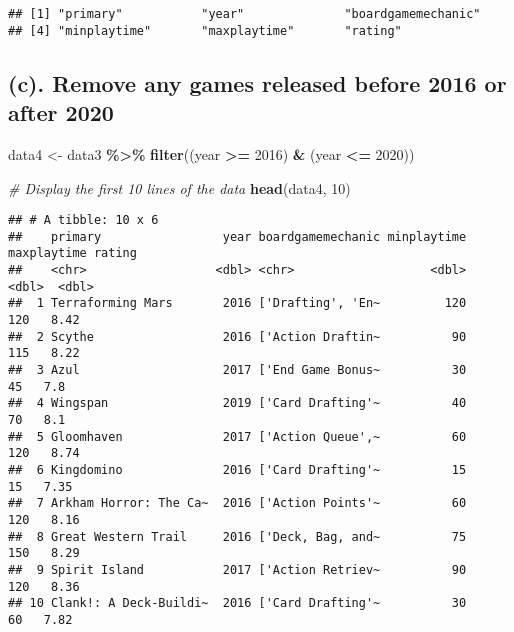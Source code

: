 \documentclass[
]{article}
\newenvironment{Shaded}{\begin{snugshade}}{\end{snugshade}}
\newcommand{\CommentTok}[1]{\textcolor[rgb]{0.56,0.35,0.01}{\textit{#1}}}
\newcommand{\DecValTok}[1]{\textcolor[rgb]{0.00,0.00,0.81}{#1}}
\newcommand{\FunctionTok}[1]{\textcolor[rgb]{0.13,0.29,0.53}{\textbf{#1}}}
\newcommand{\NormalTok}[1]{#1}
\newcommand{\OtherTok}[1]{\textcolor[rgb]{0.56,0.35,0.01}{#1}}
\newcommand{\SpecialCharTok}[1]{\textcolor[rgb]{0.81,0.36,0.00}{\textbf{#1}}}
\begin{document}
\begin{verbatim}
## [1] "primary"           "year"              "boardgamemechanic"
## [4] "minplaytime"       "maxplaytime"       "rating"
\end{verbatim}

\hypertarget{c.-remove-any-games-released-before-2016-or-after-2020}{%
\subsection{(c). Remove any games released before 2016 or after 2020}\label{c.-remove-any-games-released-before-2016-or-after-2020}}

\begin{Shaded}
\begin{Highlighting}[]
\NormalTok{data4 }\OtherTok{\textless{}{-}}\NormalTok{ data3 }\SpecialCharTok{\%\textgreater{}\%}
  \FunctionTok{filter}\NormalTok{((year }\SpecialCharTok{\textgreater{}=} \DecValTok{2016}\NormalTok{) }\SpecialCharTok{\&}\NormalTok{ (year }\SpecialCharTok{\textless{}=} \DecValTok{2020}\NormalTok{))}

\CommentTok{\# Display the first 10 lines of the data}
\FunctionTok{head}\NormalTok{(data4, }\DecValTok{10}\NormalTok{)}
\end{Highlighting}
\end{Shaded}

\begin{verbatim}
## # A tibble: 10 x 6
##    primary                 year boardgamemechanic minplaytime maxplaytime rating
##    <chr>                  <dbl> <chr>                   <dbl>       <dbl>  <dbl>
##  1 Terraforming Mars       2016 ['Drafting', 'En~         120         120   8.42
##  2 Scythe                  2016 ['Action Draftin~          90         115   8.22
##  3 Azul                    2017 ['End Game Bonus~          30          45   7.8 
##  4 Wingspan                2019 ['Card Drafting'~          40          70   8.1 
##  5 Gloomhaven              2017 ['Action Queue',~          60         120   8.74
##  6 Kingdomino              2016 ['Card Drafting'~          15          15   7.35
##  7 Arkham Horror: The Ca~  2016 ['Action Points'~          60         120   8.16
##  8 Great Western Trail     2016 ['Deck, Bag, and~          75         150   8.29
##  9 Spirit Island           2017 ['Action Retriev~          90         120   8.36
## 10 Clank!: A Deck-Buildi~  2016 ['Card Drafting'~          30          60   7.82
\end{verbatim}

\begin{Shaded}
\end{Shaded}
\end{document}
